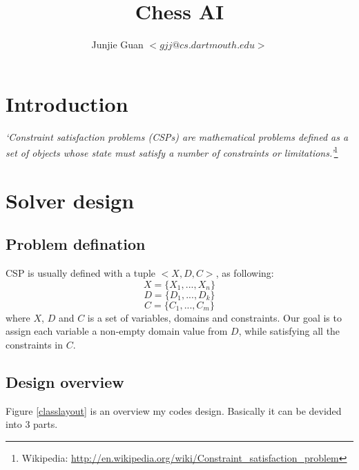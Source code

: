\documentclass{article}
\title{Chess AI}
\author{Junjie Guan $<gjj@cs.dartmouth.edu>$}
\begin{document}
\maketitle

\tableofcontents

\section{Introduction}

\emph{`Constraint satisfaction problems (CSPs) are mathematical problems defined as a set of objects whose state must satisfy a number of constraints or limitations.'}\footnote{Wikipedia: \url{http://en.wikipedia.org/wiki/Constraint_satisfaction_problem}}













\clearpage
\section{Solver design}
\subsection{Problem defination}
CSP is usually defined  with a tuple $<X, D, C>$, as following:
$$X = \{X_1, ..., X_n\}$$
$$D = \{D_1, ..., D_k\}$$
$$C = \{C_1, ..., C_m\}$$
where  $X$, $D$ and $C$ is a set of variables, domains and constraints. Our goal is to assign each variable a non-empty domain value from $D$, while satisfying all the constraints in $C$.

\subsection{Design overview}
Figure \ref{classlayout} is an overview my codes design. Basically it can be devided into 3 parts.  
\end{document}

